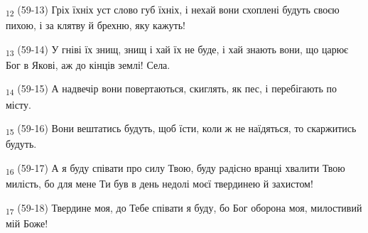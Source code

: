 \begin{tcolorbox}
\textsubscript{12} (59-13) Гріх їхніх уст слово губ їхніх, і нехай вони схоплені будуть своєю пихою, і за клятву й брехню, яку кажуть!
\end{tcolorbox}
\begin{tcolorbox}
\textsubscript{13} (59-14) У гніві їх знищ, знищ і хай їх не буде, і хай знають вони, що царює Бог в Якові, аж до кінців землі! Села.
\end{tcolorbox}
\begin{tcolorbox}
\textsubscript{14} (59-15) А надвечір вони повертаються, скиглять, як пес, і перебігають по місту.
\end{tcolorbox}
\begin{tcolorbox}
\textsubscript{15} (59-16) Вони вештатись будуть, щоб їсти, коли ж не наїдяться, то скаржитись будуть.
\end{tcolorbox}
\begin{tcolorbox}
\textsubscript{16} (59-17) А я буду співати про силу Твою, буду радісно вранці хвалити Твою милість, бо для мене Ти був в день недолі моєї твердинею й захистом!
\end{tcolorbox}
\begin{tcolorbox}
\textsubscript{17} (59-18) Твердине моя, до Тебе співати я буду, бо Бог оборона моя, милостивий мій Боже!
\end{tcolorbox}
